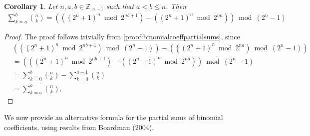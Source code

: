 \documentclass{article}
\theoremstyle{plain}
\newtheorem{corollary}[theorem]{Corollary}
\theoremstyle{definition}
\newcommand{\Z}{\mathbb{Z}}
\begin{document}
\begin{corollary}
Let $n,a,b \in \Z_{>-1}$ such that $a < b \leq n$. Then
\begin{align*}
\sum_{k=a}^{b} \binom{n}{k}
=
\left(
    \left( (2^n+1)^n \bmod 2^{nb+1} \right)
    - \left( (2^n+1)^n \bmod 2^{na} \right)
\right)
\bmod (2^n-1) 
\end{align*}
\end{corollary}
\begin{proof}
The proof follows trivially from \cref{proof:binomialcoeffpartialsums}, since
\begin{align*}
& \left(\left( (2^n+1)^n \bmod 2^{nb+1} \right) \bmod (2^n-1)\right)
- \left(\left( (2^n+1)^n \bmod 2^{na} \right) \bmod (2^n-1)\right)
 \\
&= \left(
    \left( (2^n+1)^n \bmod 2^{nb+1} \right)
    - \left( (2^n+1)^n \bmod 2^{na} \right)
\right)
\bmod (2^n-1) \\
&= \sum_{k=0}^{b} \binom{n}{k} - \sum_{k=0}^{a-1} \binom{n}{k} \\
&= \sum_{k=a}^{b} \binom{n}{k} .
\end{align*}
\end{proof}

We now provide an alternative formula for the partial sums of binomial coefficients, using results from Boardman (2004).
\end{document}
